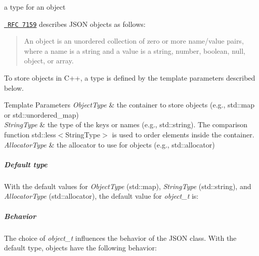 a type for an object 

\href{http://rfc7159.net/rfc7159}{\texttt{ R\+FC 7159}} describes J\+S\+ON objects as follows\+: \begin{quote}
An object is an unordered collection of zero or more name/value pairs, where a name is a string and a value is a string, number, boolean, null, object, or array. \end{quote}


To store objects in C++, a type is defined by the template parameters described below.


\begin{DoxyTemplParams}{Template Parameters}
{\em Object\+Type} & the container to store objects (e.\+g., {\ttfamily std\+::map} or {\ttfamily std\+::unordered\+\_\+map}) \\
\hline
{\em String\+Type} & the type of the keys or names (e.\+g., {\ttfamily std\+::string}). The comparison function {\ttfamily std\+::less$<$String\+Type$>$} is used to order elements inside the container. \\
\hline
{\em Allocator\+Type} & the allocator to use for objects (e.\+g., {\ttfamily std\+::allocator})\\
\hline
\end{DoxyTemplParams}
\subparagraph*{Default type}

With the default values for {\itshape Object\+Type} ({\ttfamily std\+::map}), {\itshape String\+Type} ({\ttfamily std\+::string}), and {\itshape Allocator\+Type} ({\ttfamily std\+::allocator}), the default value for {\itshape object\+\_\+t} is\+:


\begin{DoxyCode}{0}
\DoxyCodeLine{>}
\end{DoxyCode}


\subparagraph*{Behavior}

The choice of {\itshape object\+\_\+t} influences the behavior of the J\+S\+ON class. With the default type, objects have the following behavior\+:


